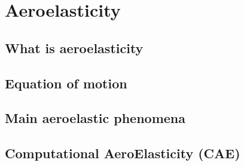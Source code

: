\chapter{Aeroelasticity}
\label{cha:ael}

\chabstract{}

\minitoc
\newpage

\section{What is aeroelasticity}
\label{sec:what_is_ael}


\section{Equation of motion}
\label{sec:ael_equation}


\section{Main aeroelastic phenomena}
\label{sec:ael_phenomena}


\section{Computational AeroElasticity (CAE)}
\label{sec:ael_cae}


\chconclu{}
